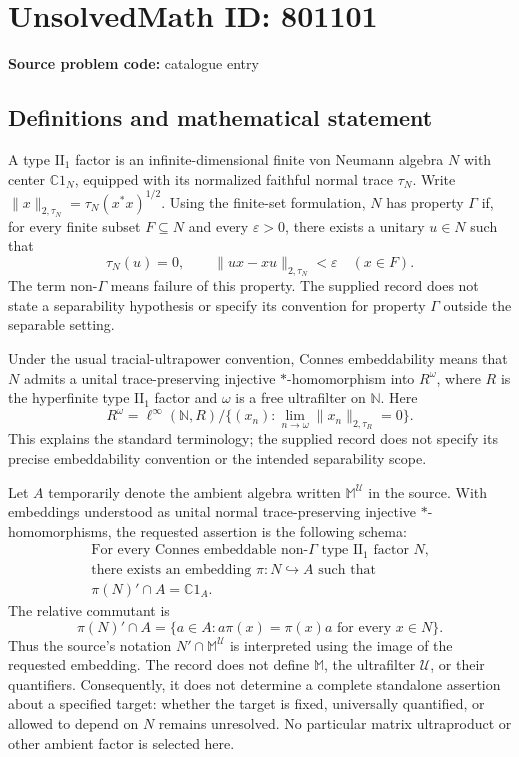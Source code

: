 \documentclass[11pt]{article}
\newcommand{\N}{\mathbb{N}}
\newcommand{\C}{\mathbb{C}}
\begin{document}
\section*{UnsolvedMath ID: 801101}
\textbf{Source problem code:} catalogue entry
\subsection{Definitions and mathematical statement}
A type \(\mathrm{II}_1\) factor is an infinite-dimensional finite von Neumann algebra \(N\) with center \(\C 1_N\), equipped with its normalized faithful normal trace \(\tau_N\). Write \(\|x\|_{2,\tau_N}=\tau_N(x^*x)^{1/2}\). Using the finite-set formulation, \(N\) has property \(\Gamma\) if, for every finite subset \(F\subseteq N\) and every \(\varepsilon>0\), there exists a unitary \(u\in N\) such that
\[
\tau_N(u)=0,\qquad \|ux-xu\|_{2,\tau_N}<\varepsilon\quad(x\in F).
\]
The term non-\(\Gamma\) means failure of this property. The supplied record does not state a separability hypothesis or specify its convention for property \(\Gamma\) outside the separable setting.

Under the usual tracial-ultrapower convention, Connes embeddability means that \(N\) admits a unital trace-preserving injective \(*\)-homomorphism into \(R^\omega\), where \(R\) is the hyperfinite type \(\mathrm{II}_1\) factor and \(\omega\) is a free ultrafilter on \(\N\). Here
\[
R^\omega=\ell^\infty(\N,R)\big/\{(x_n):\lim_{n\to\omega}\|x_n\|_{2,\tau_R}=0\}.
\]
This explains the standard terminology; the supplied record does not specify its precise embeddability convention or the intended separability scope.

Let \(A\) temporarily denote the ambient algebra written \(\mathbb{M}^{\mathcal U}\) in the source. With embeddings understood as unital normal trace-preserving injective \(*\)-homomorphisms, the requested assertion is the following schema:
\[
\begin{gathered}
\text{For every Connes embeddable non-\(\Gamma\) type \(\mathrm{II}_1\) factor \(N\),}\\
\text{there exists an embedding }\pi:N\hookrightarrow A\text{ such that}\\
\pi(N)'\cap A=\C 1_A.
\end{gathered}
\]
The relative commutant is
\[
\pi(N)'\cap A=\{a\in A:a\pi(x)=\pi(x)a\text{ for every }x\in N\}.
\]
Thus the source's notation \(N'\cap\mathbb{M}^{\mathcal U}\) is interpreted using the image of the requested embedding. The record does not define \(\mathbb M\), the ultrafilter \(\mathcal U\), or their quantifiers. Consequently, it does not determine a complete standalone assertion about a specified target: whether the target is fixed, universally quantified, or allowed to depend on \(N\) remains unresolved. No particular matrix ultraproduct or other ambient factor is selected here.
\end{document}

